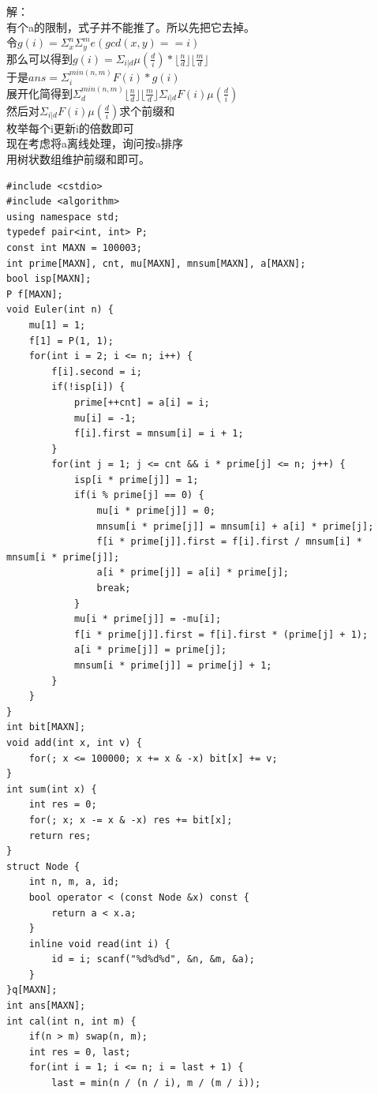 \documentclass[10pt]{ctexart}
\begin{document}
{解：\\
有个a的限制，式子并不能推了。所以先把它去掉。\\
令$g(i) = \Sigma_x^n\Sigma_y^me(gcd(x, y) == i)$\\
那么可以得到$g(i) = \Sigma_{i | d}\mu(\frac{d}{i}) *  \lfloor\frac{n}{d}\rfloor\lfloor\frac{m}{d}\rfloor$\\
于是$ans = \Sigma_i^{min(n, m)}F(i) * g(i)$\\
展开化简得到$\Sigma_d^{min(n, m)} \lfloor\frac{n}{d}\rfloor\lfloor\frac{m}{d}\rfloor\Sigma_{i | d}F(i)\mu(\frac{d}{i})$\\
然后对$\Sigma_{i | d}F(i)\mu(\frac{d}{i})$求个前缀和\\
枚举每个i更新i的倍数即可\\
现在考虑将a离线处理，询问按a排序\\
用树状数组维护前缀和即可。\\
\begin{lstlisting}
#include <cstdio>
#include <algorithm>
using namespace std;
typedef pair<int, int> P;
const int MAXN = 100003;
int prime[MAXN], cnt, mu[MAXN], mnsum[MAXN], a[MAXN];
bool isp[MAXN];
P f[MAXN];
void Euler(int n) {
    mu[1] = 1;
    f[1] = P(1, 1);
    for(int i = 2; i <= n; i++) {
        f[i].second = i;
        if(!isp[i]) {
            prime[++cnt] = a[i] = i;
            mu[i] = -1;
            f[i].first = mnsum[i] = i + 1;
        }
        for(int j = 1; j <= cnt && i * prime[j] <= n; j++) {
            isp[i * prime[j]] = 1;
            if(i % prime[j] == 0) {
                mu[i * prime[j]] = 0;
                mnsum[i * prime[j]] = mnsum[i] + a[i] * prime[j];
                f[i * prime[j]].first = f[i].first / mnsum[i] * mnsum[i * prime[j]];
                a[i * prime[j]] = a[i] * prime[j];
                break;
            }
            mu[i * prime[j]] = -mu[i];
            f[i * prime[j]].first = f[i].first * (prime[j] + 1);
            a[i * prime[j]] = prime[j];
            mnsum[i * prime[j]] = prime[j] + 1;
        }
    }
}
int bit[MAXN];
void add(int x, int v) {
    for(; x <= 100000; x += x & -x) bit[x] += v;
}
int sum(int x) {
    int res = 0;
    for(; x; x -= x & -x) res += bit[x];
    return res;
}
struct Node {
    int n, m, a, id;
    bool operator < (const Node &x) const {
        return a < x.a;
    }
    inline void read(int i) {
        id = i; scanf("%d%d%d", &n, &m, &a);
    }
}q[MAXN];
int ans[MAXN];
int cal(int n, int m) {
    if(n > m) swap(n, m);
    int res = 0, last;
    for(int i = 1; i <= n; i = last + 1) {
        last = min(n / (n / i), m / (m / i));

\end{lstlisting}}
\end{document}
